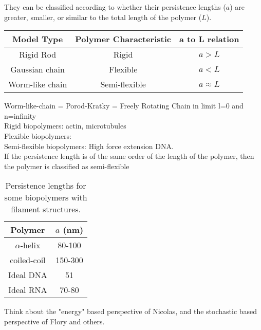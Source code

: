 They can be classified  according to whether their persistence lengths ($a$)
are greater, smaller, or similar to the total length of the polymer ($L$).

\begin{table}[htbp]
\begin{center}  
\begin{tabular}{c|c|c}
\hline
Model Type      & Polymer Characteristic & a to L relation\\ \hline
Rigid Rod       & Rigid          &        $a > L$   \\
Gaussian chain  & Flexible       &        $a < L$   \\
Worm-like chain & Semi-flexible  &    $a \approx L$ \\
\hline
\end{tabular}
\end{center}
\end{table}

Worm-like-chain = Porod-Kratky = Freely Rotating Chain in limit l=0
and n=infinity
\\

Rigid biopolymers:
actin, microtubules
\\

Flexible biopolymers:
\\

Semi-flexible biopolymers:
High force extension DNA.
\\

If the persistence length is of the same order of the length of the
polymer, then the polymer is classified as  semi-flexible


\begin{table}[htbp]
\begin{center}  
\begin{tabular}{c|c}
\hline
Polymer       & $a$ (nm)   \\ \hline
$\alpha$-helix & 80-100\\
coiled-coil & 150-300\\
Ideal DNA  &  51  \\
Ideal RNA & 70-80 \\
\hline
\end{tabular}
\caption{Persistence lengths for some biopolymers with filament structures.}
\end{center}
\end{table}

Think about the "energy" based perspective of Nicolas, and the
stochastic based perspective of Flory and others.




